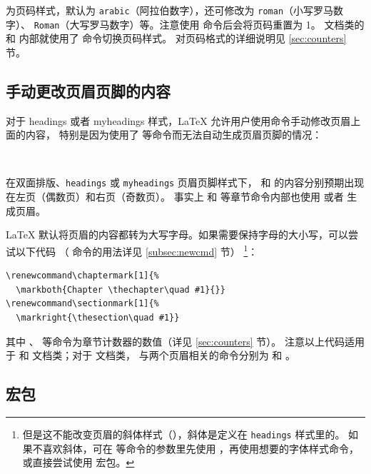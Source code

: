  为页码样式，默认为 \texttt{arabic}（阿拉伯数字），还可修改为 \texttt{roman}（小写罗马数字）、
\texttt{Roman}（大写罗马数字）等。注意使用  命令后会将页码重置为 1。 文档类的  和  内部就使用了  命令切换页码样式。
对页码格式的详细说明见 \ref{sec:counters} 节。

\subsection{手动更改页眉页脚的内容}\label{subsec:marks}

对于 headings 或者 myheadings 样式，\LaTeX{} 允许用户使用命令手动修改页眉上面的内容，
特别是因为使用了  等命令而无法自动生成页眉页脚的情况：
\begin{command}
\\
\end{command}

在双面排版、\texttt{headings} 或 \texttt{myheadings} 页眉页脚样式下， 和  的内容分别预期出现在左页（偶数页）和右页（奇数页）。
事实上  和  等章节命令内部也使用  或者  生成页眉。

\LaTeX{} 默认将页眉的内容都转为大写字母。如果需要保持字母的大小写，可以尝试以下代码
（ 命令的用法详见 \ref{subsec:newcmd} 节）%
\footnote{但是这不能改变页眉的斜体样式（），斜体是定义在 \texttt{headings} 样式里的。
如果不喜欢斜体，可在  等命令的参数里先使用 ，再使用想要的字体样式命令，
或直接尝试使用  宏包。}：
\begin{verbatim}
\renewcommand\chaptermark[1]{%
  \markboth{Chapter \thechapter\quad #1}{}}
\renewcommand\sectionmark[1]{%
  \markright{\thesection\quad #1}}
\end{verbatim}

其中 、 等命令为章节计数器的数值（详见 \ref{sec:counters} 节）。
注意以上代码适用于  和  文档类；对于  文档类，
与两个页眉相关的命令分别为  和 。

\subsection{ 宏包}\label{subsec:fancyhdr}

